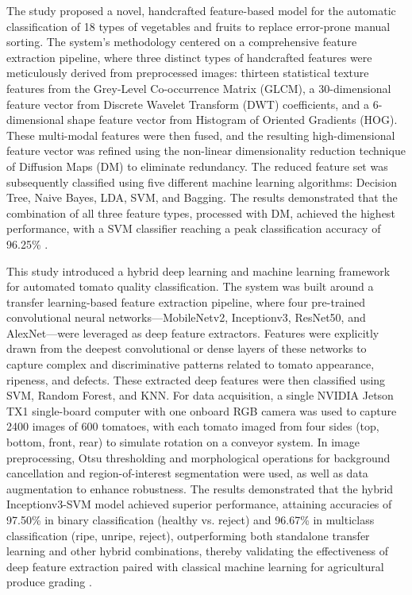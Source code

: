 {

The study proposed a novel, handcrafted feature-based model for the automatic classification of 18 types of vegetables and fruits to replace error-prone manual sorting. The system’s methodology centered on a comprehensive feature extraction pipeline, where three distinct types of handcrafted features were meticulously derived from preprocessed images: thirteen statistical texture features from the Grey-Level Co-occurrence Matrix (GLCM), a 30-dimensional feature vector from Discrete Wavelet Transform (DWT) coefficients, and a 6-dimensional shape feature vector from Histogram of Oriented Gradients (HOG). These multi-modal features were then fused, and the resulting high-dimensional feature vector was refined using the non-linear dimensionality reduction technique of Diffusion Maps (DM) to eliminate redundancy. The reduced feature set was subsequently classified using five different machine learning algorithms: Decision Tree, Naive Bayes, LDA, SVM, and Bagging. The results demonstrated that the combination of all three feature types, processed with DM, achieved the highest performance, with a SVM classifier reaching a peak classification accuracy of 96.25\% \citep{Wang2024}.


This study introduced a hybrid deep learning and machine learning framework for automated tomato quality classification. The system was built around a transfer learning-based feature extraction pipeline, where four pre-trained convolutional neural networks—MobileNetv2, Inceptionv3, ResNet50, and AlexNet—were leveraged as deep feature extractors. Features were explicitly drawn from the deepest convolutional or dense layers of these networks to capture complex and discriminative patterns related to tomato appearance, ripeness, and defects. These extracted deep features were then classified using SVM, Random Forest, and KNN. For data acquisition, a single NVIDIA Jetson TX1 single-board computer with one onboard RGB camera was used to capture 2400 images of 600 tomatoes, with each tomato imaged from four sides (top, bottom, front, rear) to simulate rotation on a conveyor system. In image preprocessing, Otsu thresholding and morphological operations for background cancellation and region-of-interest segmentation were used, as well as data augmentation to enhance robustness. The results demonstrated that the hybrid Inceptionv3-SVM model achieved superior performance, attaining accuracies of 97.50\% in binary classification (healthy vs. reject) and 96.67\% in multiclass classification (ripe, unripe, reject), outperforming both standalone transfer learning and other hybrid combinations, thereby validating the effectiveness of deep feature extraction paired with classical machine learning for agricultural produce grading \cite{Mputu2024}.

}
